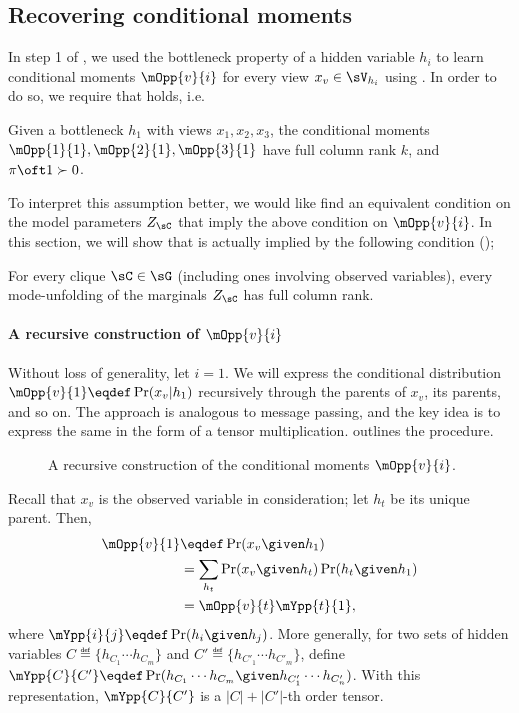 \subsection{Recovering conditional moments}
\label{app:assumption-proof}

In step 1 of \LearnMarginals, we used the bottleneck property of a hidden
  variable $h_i$ to learn conditional moments $\mOpp{v}{i}$ for every
  view $x_v \in \sV_{h_i}$ using \TensorFactorize. 
In order to do so, we require that  holds, i.e.
\begin{assumption*}
  Given a bottleneck $h_1$ with views $x_1, x_2, x_3$, the conditional
  moments $\mOpp{1}{1}, \mOpp{2}{1}, \mOpp{3}{1}$ have full column rank
  $k$, and $\pi\oft 1 \succ 0$.
\end{assumption*}

To interpret this assumption better, we would like find an equivalent
condition on the model parameters $Z_\sC$ that imply the above condition
on $\mOpp{v}{i}$. In this section, we will show that
 is actually implied by the following condition
();
\begin{assumption*}
For every clique $\sC \in \sG$ (including ones involving observed
variables), every mode-unfolding of the marginals $Z_\sC$ has full
column rank.
\end{assumption*}

\paragraph{A recursive construction of $\mOpp{v}{i}$}

Without loss of generality, let $i = 1$. We will express the conditional
distribution $\mOpp{v}{1} \eqdef \Pr(x_v | h_1)$ recursively through the
parents of $x_v$, its parents, and so on. The approach is analogous to
message passing, and the key idea is to express the same in the form of
a tensor multiplication.  outlines the
procedure.

\begin{figure}
  \label{fig:message-proof}
  \caption{A recursive construction of the conditional moments $\mOpp{v}{i}$.}
\end{figure}

Recall that $x_v$ is the observed variable in consideration; let $h_t$
be its unique parent. Then, 
\begin{align*}
  \mOpp{v}{1} &\eqdef \Pr( x_v \given h_1 )  \\
              &= \sum_{h_t} \Pr( x_v \given h_t ) \Pr( h_t \given h_1 ) \\
              &= \mOpp{v}{t} \mYpp{t}{1},
\end{align*}
where $\mYpp{i}{j} \eqdef \Pr( h_i \given h_j )$. 
More generally, for two sets of hidden variables $C \eqdef \{h_{C_1}
\cdots h_{C_m} \}$ and $C' \eqdef \{h_{C'_1} \cdots h_{C'_m} \}$, 
define $\mYpp{C}{C'} \eqdef \Pr( h_{C_1} \cdots h_{C_m} \given h_{C'_1}
\cdots h_{C'_n} )$. 
With this representation, $\mYpp{C}{C'}$ is a $|C| + |C'|$-th order
tensor.
  
